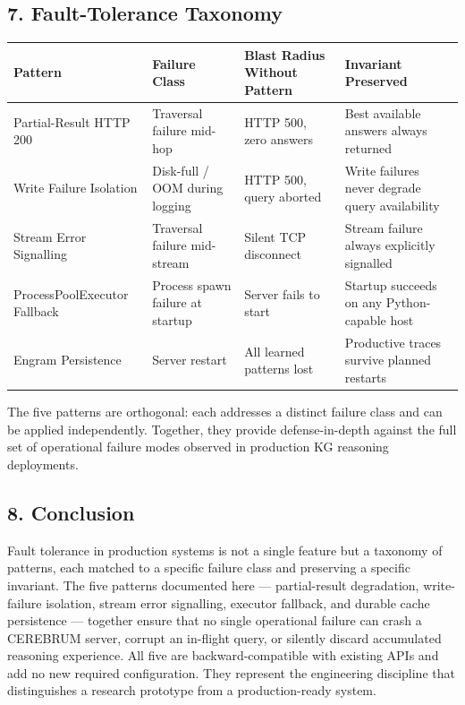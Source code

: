 \subsection*{7. Fault-Tolerance Taxonomy}

\begin{table}[h]
\small\centering
\begin{tabular}{llll}
\toprule
Pattern & Failure Class & Blast Radius Without Pattern & Invariant Preserved \\
\midrule
Partial-Result HTTP 200 & Traversal failure mid-hop & HTTP 500, zero answers & Best available answers always returned \\
Write Failure Isolation & Disk-full / OOM during logging & HTTP 500, query aborted & Write failures never degrade query availability \\
Stream Error Signalling & Traversal failure mid-stream & Silent TCP disconnect & Stream failure always explicitly signalled \\
ProcessPoolExecutor Fallback & Process spawn failure at startup & Server fails to start & Startup succeeds on any Python-capable host \\
Engram Persistence & Server restart & All learned patterns lost & Productive traces survive planned restarts \\
\bottomrule
\end{tabular}
\end{table}


The five patterns are orthogonal: each addresses a distinct failure class and can be applied independently. Together, they provide defense-in-depth against the full set of operational failure modes observed in production KG reasoning deployments.

\subsection*{8. Conclusion}
Fault tolerance in production systems is not a single feature but a taxonomy of patterns, each matched to a specific failure class and preserving a specific invariant. The five patterns documented here --- partial-result degradation, write-failure isolation, stream error signalling, executor fallback, and durable cache persistence --- together ensure that no single operational failure can crash a CEREBRUM server, corrupt an in-flight query, or silently discard accumulated reasoning experience. All five are backward-compatible with existing APIs and add no new required configuration. They represent the engineering discipline that distinguishes a research prototype from a production-ready system.
